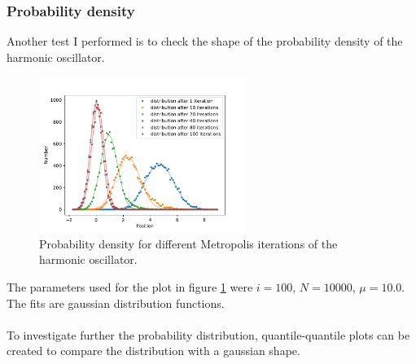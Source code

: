 \documentclass{scrartcl}
\begin{document}
	\subsubsection{Probability density}
		Another test I performed is to check the shape of the probability density of the harmonic oscillator.
		\begin{figure}[H]
			\centering
				\includegraphics[width=0.6\textwidth]{../imgs/harmonic_oscillator_track/track_10010000_gauss_1_fit.pdf}
			\caption{Probability density for different Metropolis iterations of the harmonic oscillator.}
			\label{fig:harmonic_oscillator_track_10010000_gauss_1_fit}
		\end{figure}
		The parameters used for the plot in figure \ref{fig:harmonic_oscillator_track_10010000_gauss_1_fit} were $i=100$, $N=10000$, $\mu = 10.0$.
		The fits are gaussian distribution functions.
		\\\\
		To investigate further the probability distribution, quantile-quantile plots can be created to compare the distribution with a gaussian shape.
\end{document}
